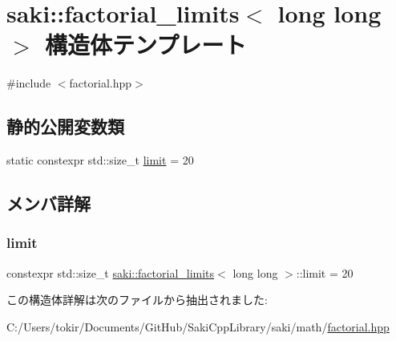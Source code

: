 \hypertarget{structsaki_1_1factorial__limits_3_01long_01long_01_4}{}\section{saki\+:\+:factorial\+\_\+limits$<$ long long $>$ 構造体テンプレート}
\label{structsaki_1_1factorial__limits_3_01long_01long_01_4}


{\ttfamily \#include $<$factorial.\+hpp$>$}

\subsection*{静的公開変数類}
\begin{DoxyCompactItemize}
\item 
static constexpr std\+::size\+\_\+t \mbox{\hyperlink{structsaki_1_1factorial__limits_3_01long_01long_01_4_abe04cda0d5e8234c771c7c3c49396faf}{limit}} = 20
\end{DoxyCompactItemize}


\subsection{メンバ詳解}
\mbox{\label{structsaki_1_1factorial__limits_3_01long_01long_01_4_abe04cda0d5e8234c771c7c3c49396faf}} 
\subsubsection{\texorpdfstring{limit}{limit}}
{\footnotesize\ttfamily constexpr std\+::size\+\_\+t \mbox{\hyperlink{structsaki_1_1factorial__limits}{saki\+::factorial\+\_\+limits}}$<$ long long $>$\+::limit = 20\hspace{0.3cm}{\ttfamily [static]}}



この構造体詳解は次のファイルから抽出されました\+:\begin{DoxyCompactItemize}
\item 
C\+:/\+Users/tokir/\+Documents/\+Git\+Hub/\+Saki\+Cpp\+Library/saki/math/\mbox{\hyperlink{factorial_8hpp}{factorial.\+hpp}}\end{DoxyCompactItemize}
